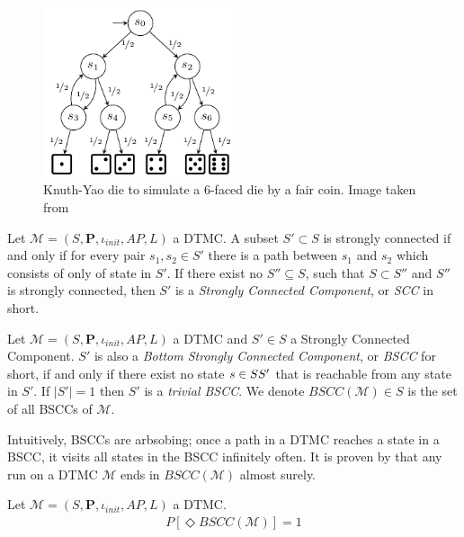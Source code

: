 \begin{example}
    \begin{figure}[H]
        \centering
        \includegraphics[width=0.5\textwidth]{figures/knuth_die.png}
        \caption{Knuth-Yao die to simulate a 6-faced die by a fair coin. Image taken from }
    \end{figure}
\end{example}

\begin{definition}
    Let $\mathcal{M}=(S,\mathbf{P}, \iota_{init}, AP,L)$ a DTMC. A subset $S'\subset S$ is strongly
    connected if and only if for every pair $s_1,s_2\in S'$ there is a path between $s_1$ and $s_2$
    which consists of only of state in $S'$. If there exist no $S''\subseteq S$, such that $S\subset
        S''$ and $S''$ is strongly connected, then $S'$ is a \textit{Strongly Connected Component}, or
    \textit{SCC} in short.
\end{definition}

\begin{definition}
    Let $\mathcal{M}=(S,\mathbf{P}, \iota_{init}, AP,L)$ a DTMC and $S'\in S$ a Strongly Connected
    Component. $S'$ is also a \textit{Bottom Strongly Connected Component}, or \textit{BSCC} for
    short, if and only if there exist no state $s \in S\\S'$ that is reachable from any state in
    $S'$. If $|S'|=1$ then $S'$ is a \textit{trivial BSCC}. We denote $BSCC(\mathcal{M})\in S$ is
    the set of all BSCCs of $\mathcal{M}$.
\end{definition}
Intuitively, BSCCs are arbsobing; once a path in a DTMC reaches a state in a BSCC, it visits  all
states in the BSCC infinitely often. It is proven by \cite{baier2008principles} that any run on a
DTMC $\mathcal{M}$ ends in $BSCC(\mathcal{M})$ almost surely.
\begin{theorem}
    Let $\mathcal{M}=(S,\mathbf{P}, \iota_{init}, AP,L)$ a DTMC.
    \begin{align*}
        P[\Diamond BSCC(\mathcal{M})] = 1
    \end{align*}
\end{theorem}

